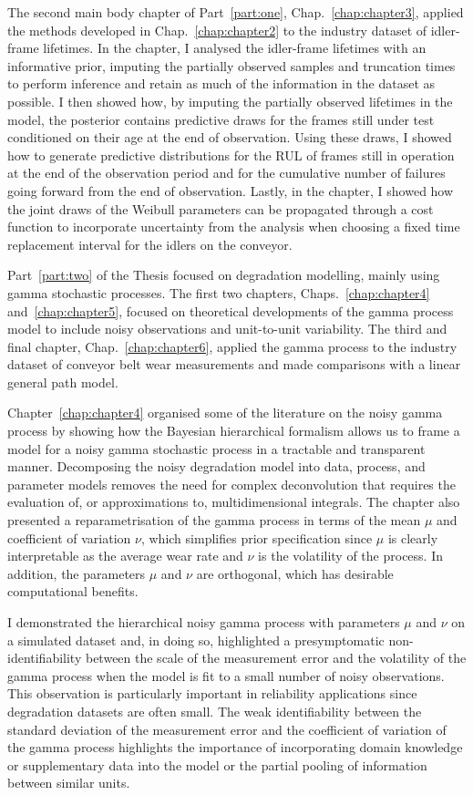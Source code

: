 The second main body chapter of Part~\ref{part:one}, Chap.~\ref{chap:chapter3}, applied the methods developed in Chap.~\ref{chap:chapter2} to the industry dataset of idler-frame lifetimes. In the chapter, I analysed the idler-frame lifetimes with an informative prior, imputing the partially observed samples and truncation times to perform inference and retain as much of the information in the dataset as possible. I then showed how, by imputing the partially observed lifetimes in the model, the posterior contains predictive draws for the frames still under test conditioned on their age at the end of observation. Using these draws, I showed how to generate predictive distributions for the RUL of frames still in operation at the end of the observation period and for the cumulative number of failures going forward from the end of observation. Lastly, in the chapter, I showed how the joint draws of the Weibull parameters can be propagated through a cost function to incorporate uncertainty from the analysis when choosing a fixed time replacement interval for the idlers on the conveyor. 

Part~\ref{part:two} of the Thesis focused on degradation modelling, mainly using gamma stochastic processes. The first two chapters, Chaps.~\ref{chap:chapter4} and~\ref{chap:chapter5}, focused on theoretical developments of the gamma process model to include noisy observations and unit-to-unit variability. The third and final chapter, Chap.~\ref{chap:chapter6}, applied the gamma process to the industry dataset of conveyor belt wear measurements and made comparisons with a linear general path model.

Chapter~\ref{chap:chapter4} organised some of the literature on the noisy gamma process by showing how the Bayesian hierarchical formalism allows us to frame a model for a noisy gamma stochastic process in a tractable and transparent manner. Decomposing the noisy degradation model into data, process, and parameter models removes the need for complex deconvolution that requires the evaluation of, or approximations to, multidimensional integrals. The chapter also presented a reparametrisation of the gamma process in terms of the mean $\mu$ and coefficient of variation $\nu$, which simplifies prior specification since $\mu$ is clearly interpretable as the average wear rate and $\nu$ is the volatility of the process. In addition, the parameters $\mu$ and $\nu$ are orthogonal, which has desirable computational benefits.

I demonstrated the hierarchical noisy gamma process with parameters $\mu$ and $\nu$ on a simulated dataset and, in doing so, highlighted a presymptomatic non-identifiability between the scale of the measurement error and the volatility of the gamma process when the model is fit to a small number of noisy observations. This observation is particularly important in reliability applications since degradation datasets are often small. The weak identifiability between the standard deviation of the measurement error and the coefficient of variation of the gamma process highlights the importance of incorporating domain knowledge or supplementary data into the model or the partial pooling of information between similar units.

